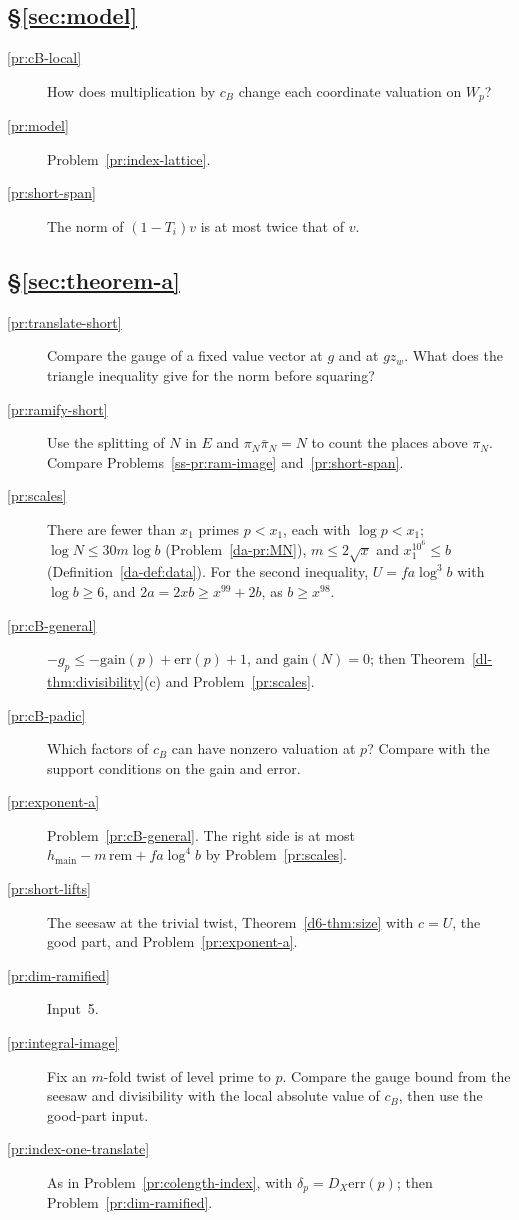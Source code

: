 \documentclass[reqno]{amsart}
\theoremstyle{definition}
\theoremstyle{plain}
\theoremstyle{definition}
\newcommand{\gain}{\mathrm{gain}}
\newcommand{\err}{\mathrm{err}}
\newcommand{\rem}{\mathrm{rem}}
\newcommand{\hm}{h_{\mathrm{main}}}
\begin{document}
\subsection*{\S\ref{sec:model}}
\begin{description}
\item[\ref{pr:cB-local}] How does multiplication by \(c_B\) change each coordinate valuation on \(W_p\)?
\item[\ref{pr:model}] Problem~\ref{pr:index-lattice}.
\item[\ref{pr:short-span}] The norm of \((1 - T_i)v\) is at most twice that of \(v\).
\end{description}

\subsection*{\S\ref{sec:theorem-a}}
\begin{description}
\item[\ref{pr:translate-short}] Compare the gauge of a fixed value vector at \(g\) and at \(gz_w\).  What does the triangle inequality give for the norm before squaring?
\item[\ref{pr:ramify-short}] Use the splitting of \(N\) in \(E\) and \(\pi_N\bar\pi_N=N\) to count the places above \(\pi_N\).  Compare Problems~\ref{ss-pr:ram-image} and~\ref{pr:short-span}.
\item[\ref{pr:scales}] There are fewer than \(x_1\) primes \(p < x_1\), each with \(\log p < x_1\); \(\log N \le 30m\log b\) (Problem~\ref{da-pr:MN}), \(m \le 2\sqrt x\) and \(x_1^{10^6} \le b\) (Definition~\ref{da-def:data}).  For the second inequality, \(U = fa\log^3 b\) with \(\log b \ge 6\), and \(2a = 2xb \ge x^{99} + 2b\), as \(b \ge x^{98}\).
\item[\ref{pr:cB-general}] \(-g_p \le -\gain(p) + \err(p) + 1\), and \(\gain(N) = 0\); then Theorem~\ref{dl-thm:divisibility}(c) and Problem~\ref{pr:scales}.
\item[\ref{pr:cB-padic}] Which factors of \(c_B\) can have nonzero valuation at \(p\)?  Compare with the support conditions on the gain and error.
\item[\ref{pr:exponent-a}] Problem~\ref{pr:cB-general}.  The right side is at most \(\hm - m\,\rem + fa\log^4 b\) by Problem~\ref{pr:scales}.
\item[\ref{pr:short-lifts}] The seesaw at the trivial twist, Theorem~\ref{d6-thm:size} with \(c = U\), the good part, and Problem~\ref{pr:exponent-a}.
\item[\ref{pr:dim-ramified}] Input~5.
\item[\ref{pr:integral-image}] Fix an \(m\)-fold twist of level prime to \(p\).  Compare the gauge bound from the seesaw and divisibility with the local absolute value of \(c_B\), then use the good-part input.
\item[\ref{pr:index-one-translate}] As in Problem~\ref{pr:colength-index}, with \(\delta_p = D_X\err(p)\); then Problem~\ref{pr:dim-ramified}.
\end{description}
\end{document}
